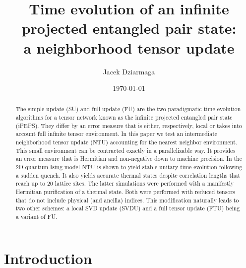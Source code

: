 \documentclass[prb,twocolumn,showkeys,showpacs,amsmath,amsfonts,floatfix,superscriptaddress,nofootinbib]{revtex4-1}
\begin{document}
\title{ Time evolution of an infinite projected entangled pair state: \\
                     a neighborhood tensor update  }     
                            
             
\author{Jacek Dziarmaga}
                     


\date{\today}

\begin{abstract}
The simple update (SU) and full update (FU) are the two paradigmatic time evolution algorithms for a tensor network known as the infinite projected entangled pair state (iPEPS). They differ by an error measure that is either, respectively, local or takes into account full infinite tensor environment. In this paper we test an intermediate neighborhood tensor update (NTU) accounting for the nearest neighbor environment.
%
This small environment can be contracted exactly in a parallelizable way. 
It provides an error measure that is Hermitian and non-negative down to machine precision.
%
In the 2D quantum Ising model NTU is shown to yield stable unitary time evolution following a sudden quench.
%
It also yields accurate thermal states despite correlation lengths that reach up to 20 lattice sites.
%
The latter simulations were performed with a manifestly Hermitian purification of a thermal state. 
%
Both were performed with reduced tensors that do not include physical (and ancilla) indices.
This modification naturally leads to two other schemes: 
a local SVD update (SVDU) and a full tensor update (FTU) being a variant of FU.
\end{abstract}

\maketitle


\section{Introduction}
\label{sec:introduction}
\end{document}
